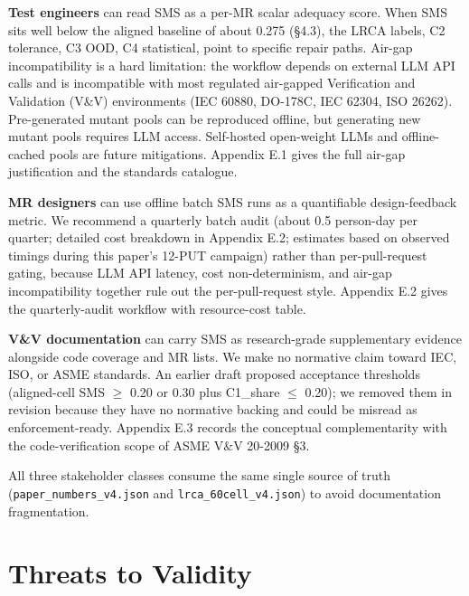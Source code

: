 \documentclass[acmsmall,screen,review]{acmart}
\begin{document}
\textbf{Test engineers} can read SMS as a per-MR scalar adequacy score.
When SMS sits well below the aligned baseline of about 0.275 (§4.3), the
LRCA labels, C2 tolerance, C3 OOD, C4 statistical, point to specific
repair paths. Air-gap incompatibility is a hard limitation: the workflow
depends on external LLM API calls and is incompatible with most
regulated air-gapped Verification and Validation (V\&V) environments
(IEC 60880, DO-178C, IEC 62304, ISO 26262). Pre-generated mutant pools
can be reproduced offline, but generating new mutant pools requires LLM
access. Self-hosted open-weight LLMs and offline-cached pools are future
mitigations. Appendix E.1 gives the full air-gap justification and the
standards catalogue.

\textbf{MR designers} can use offline batch SMS runs as a quantifiable
design-feedback metric. We recommend a quarterly batch audit (about 0.5
person-day per quarter; detailed cost breakdown in Appendix E.2;
estimates based on observed timings during this paper's 12-PUT campaign)
rather than per-pull-request gating, because LLM API latency, cost
non-determinism, and air-gap incompatibility together rule out the
per-pull-request style. Appendix E.2 gives the quarterly-audit workflow
with resource-cost table.

\textbf{V\&V documentation} can carry SMS as research-grade
supplementary evidence alongside code coverage and MR lists. We make no
normative claim toward IEC, ISO, or ASME standards. An earlier draft
proposed acceptance thresholds (aligned-cell SMS $\geq$ 0.20 or 0.30 plus
C1\_share $\leq$ 0.20); we removed them in revision because they have no
normative backing and could be misread as enforcement-ready. Appendix
E.3 records the conceptual complementarity with the code-verification
scope of ASME V\&V 20-2009 §3.

All three stakeholder classes consume the same single source of truth
(\texttt{paper\_numbers\_v4.json} and \texttt{lrca\_60cell\_v4.json}) to
avoid documentation fragmentation.


\section{Threats to Validity}\label{threats-to-validity}
\end{document}
